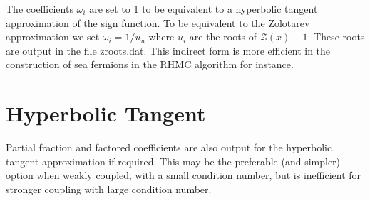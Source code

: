\documentclass[11pt]{article}
\begin{document}
The coefficients $\omega_i$ are set to 1 to be equivalent to a hyperbolic tangent approximation of the sign function. To be equivalent to the Zolotarev approximation we set $\omega_i=1/u_u$ where $u_i$ are the roots of $\mathcal{Z}(x)-1$. These roots are output in the file zroots.dat. This indirect form is more efficient in the construction of sea fermions in the RHMC algorithm for instance.


\section{Hyperbolic Tangent}

  Partial fraction and factored coefficients are also output for the hyperbolic tangent approximation if required. This may be the preferable (and simpler) option when weakly coupled, with a small condition number, but is inefficient for stronger coupling with large condition number.
  
\end{document}
